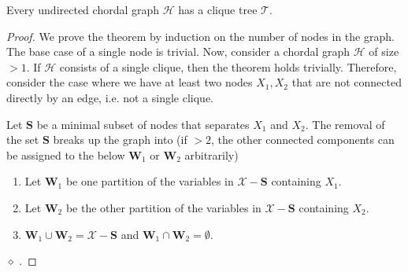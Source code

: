 \documentclass{article}
\begin{document}
\begin{thma}\label{thm:fdaxv}
Every undirected chordal graph $\mathcal{H}$ has a clique tree $\mathcal{T}$.
\end{thma}
\begin{proof}
We prove the theorem by induction on the number of nodes in the graph. The base case of a single node is trivial. Now, consider a chordal graph $\mathcal{H}$ of size $>1$. If $\mathcal{H}$ consists of a single clique, then the theorem holds trivially. Therefore, consider the case where we have at least two nodes $X_{1}, X_{2}$ that are not connected directly by an edge, i.e. not a single clique. 

Let $\boldsymbol{S}$ be a minimal subset of nodes that separates $X_{1}$ and $X_{2}$. The removal of the set $\boldsymbol{S}$ breaks up the graph into  (if $>2$, the other connected components can be assigned to the below $\boldsymbol{W}_{1}$ or $\boldsymbol{W}_{2}$ arbitrarily)
\begin{enumerate}
    \item Let $\boldsymbol{W}_{1}$ be one partition of the variables in $\mathcal{X}-\boldsymbol{S}$ containing $X_{1}$.
    \item Let  $\boldsymbol{W}_{2}$ be the other partition of the variables in $\mathcal{X}-\boldsymbol{S}$ containing $X_{2}$.
    \item $\boldsymbol{W}_{1}\cup\boldsymbol{W}_{2}=\mathcal{X}-\boldsymbol{S}$ and  $\boldsymbol{W}_{1}\cap\boldsymbol{W}_{2}=\emptyset$.
\end{enumerate}

 $\diamond$ . 
 

\end{proof}
\end{document}

